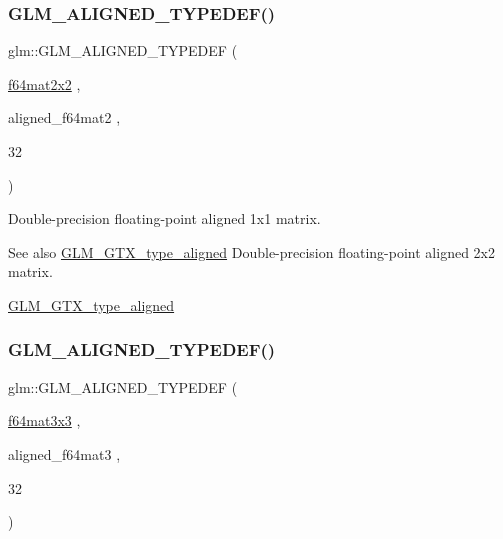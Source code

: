 \subsubsection{\texorpdfstring{G\+L\+M\+\_\+\+A\+L\+I\+G\+N\+E\+D\+\_\+\+T\+Y\+P\+E\+D\+E\+F()}{GLM\_ALIGNED\_TYPEDEF()}\hspace{0.1cm}{\footnotesize\ttfamily [193/209]}}
{\footnotesize\ttfamily glm\+::\+G\+L\+M\+\_\+\+A\+L\+I\+G\+N\+E\+D\+\_\+\+T\+Y\+P\+E\+D\+EF (\begin{DoxyParamCaption}\item[{\hyperlink{group__gtc__type__precision_ga1e14d8b4e18898be51cd719fda213dcc}{f64mat2x2}}]{,  }\item[{aligned\+\_\+f64mat2}]{,  }\item[{32}]{ }\end{DoxyParamCaption})}

Double-\/precision floating-\/point aligned 1x1 matrix. \begin{DoxySeeAlso}{See also}
\hyperlink{group__gtx__type__aligned}{G\+L\+M\+\_\+\+G\+T\+X\+\_\+type\+\_\+aligned} Double-\/precision floating-\/point aligned 2x2 matrix. 

\hyperlink{group__gtx__type__aligned}{G\+L\+M\+\_\+\+G\+T\+X\+\_\+type\+\_\+aligned} 
\end{DoxySeeAlso}
\mbox{\label{group__gtx__type__aligned_gaae8e4639c991e64754145ab8e4c32083}} 
\subsubsection{\texorpdfstring{G\+L\+M\+\_\+\+A\+L\+I\+G\+N\+E\+D\+\_\+\+T\+Y\+P\+E\+D\+E\+F()}{GLM\_ALIGNED\_TYPEDEF()}\hspace{0.1cm}{\footnotesize\ttfamily [194/209]}}
{\footnotesize\ttfamily glm\+::\+G\+L\+M\+\_\+\+A\+L\+I\+G\+N\+E\+D\+\_\+\+T\+Y\+P\+E\+D\+EF (\begin{DoxyParamCaption}\item[{\hyperlink{group__gtc__type__precision_gab272e67eb87cc1e8233237480c2aa8d2}{f64mat3x3}}]{,  }\item[{aligned\+\_\+f64mat3}]{,  }\item[{32}]{ }\end{DoxyParamCaption})}

